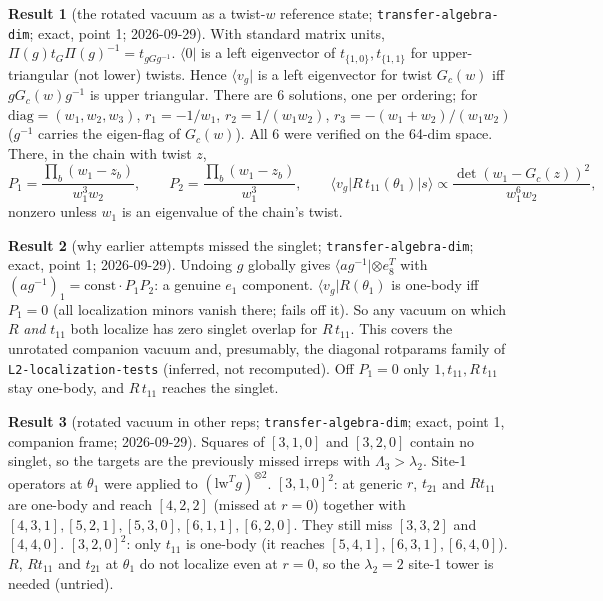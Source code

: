 \documentclass[11pt]{article}
\newcommand{\nb}[1]{\texttt{#1}}
\newcommand{\vac}{\langle 0|}
\theoremstyle{definition}
\newtheorem{result}{Result}
\theoremstyle{remark}
\begin{document}
\begin{result}[{the rotated vacuum as a twist-$w$ reference state; \nb{transfer-algebra-dim}; exact, point 1; 2026-09-29}]
With standard matrix units, $\Pi(g)t_G\Pi(g)^{-1}=t_{gGg^{-1}}$. $\vac$ is a left eigenvector of $t_{\{1,0\}},t_{\{1,1\}}$ for upper-triangular (not lower) twists.
Hence $\langle v_g|$ is a left eigenvector for twist $G_c(w)$ iff $gG_c(w)g^{-1}$ is upper triangular. There are 6 solutions, one per ordering; for $\mathrm{diag}=(w_1,w_2,w_3)$,
$r_1=-1/w_1$, $r_2=1/(w_1w_2)$, $r_3=-(w_1+w_2)/(w_1w_2)$ ($g^{-1}$ carries the eigen-flag of $G_c(w)$). All 6 were verified on the 64-dim space.
There, in the chain with twist $z$,
\[
P_1=\frac{\prod_b(w_1-z_b)}{w_1^3w_2},\qquad P_2=\frac{\prod_b(w_1-z_b)}{w_1^3},\qquad \langle v_g|R\,t_{11}(\theta_1)|s\rangle\propto\frac{\det(w_1-G_c(z))^2}{w_1^6w_2},
\]
nonzero unless $w_1$ is an eigenvalue of the chain's twist.
\end{result}

\begin{result}[{why earlier attempts missed the singlet; \nb{transfer-algebra-dim}; exact, point 1; 2026-09-29}]
Undoing $g$ globally gives $\langle ag^{-1}|\otimes e_8^T$ with $(ag^{-1})_1=\mathrm{const}\cdot P_1P_2$: a genuine $e_1$ component.
$\langle v_g|R(\theta_1)$ is one-body iff $P_1=0$ (all localization minors vanish there; fails off it). So any vacuum on which $R$ \emph{and} $t_{11}$ both localize has zero singlet overlap for $R\,t_{11}$.
This covers the unrotated companion vacuum and, presumably, the diagonal rotparams family of \nb{L2-localization-tests} (inferred, not recomputed).
Off $P_1=0$ only $1,t_{11},R\,t_{11}$ stay one-body, and $R\,t_{11}$ reaches the singlet.
\end{result}

\begin{result}[{rotated vacuum in other reps; \nb{transfer-algebra-dim}; exact, point 1, companion frame; 2026-09-29}]
Squares of $[3,1,0]$ and $[3,2,0]$ contain no singlet, so the targets are the previously missed irreps with $\Lambda_3>\lambda_2$. Site-1 operators at $\theta_1$ were applied to $(\mathrm{lw}^Tg)^{\otimes2}$.
$[3,1,0]^2$: at generic $r$, $t_{21}$ and $Rt_{11}$ are one-body and reach $[4,2,2]$ (missed at $r=0$) together with $[4,3,1],[5,2,1],[5,3,0],[6,1,1],[6,2,0]$. They still miss $[3,3,2]$ and $[4,4,0]$.
$[3,2,0]^2$: only $t_{11}$ is one-body (it reaches $[5,4,1],[6,3,1],[6,4,0]$). $R$, $Rt_{11}$ and $t_{21}$ at $\theta_1$ do not localize even at $r=0$, so the $\lambda_2=2$ site-1 tower is needed (untried).
\end{result}
\end{document}
